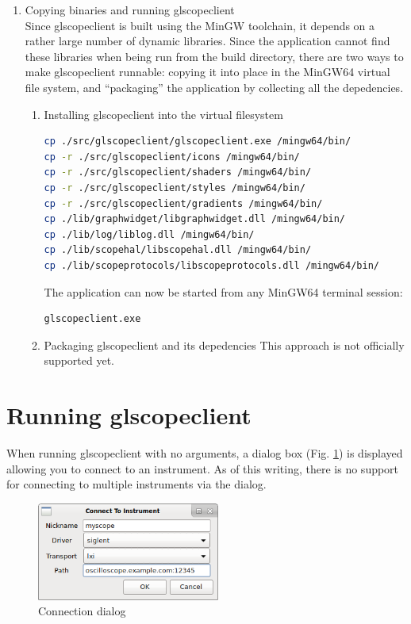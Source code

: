 \begin{enumerate}
\item Copying binaries and running glscopeclient \\
Since glscopeclient is built using the MinGW toolchain, it depends on a rather large number of dynamic libraries. Since the application cannot find these libraries when being run from the build directory, there are two ways to make glscopeclient runnable: copying it into place in the MinGW64 virtual file system, and ``packaging'' the application by collecting all the depedencies.

\begin{enumerate}
\item Installing glscopeclient into the virtual filesystem
\begin{lstlisting}[language=sh]
cp ./src/glscopeclient/glscopeclient.exe /mingw64/bin/
cp -r ./src/glscopeclient/icons /mingw64/bin/
cp -r ./src/glscopeclient/shaders /mingw64/bin/
cp -r ./src/glscopeclient/styles /mingw64/bin/
cp -r ./src/glscopeclient/gradients /mingw64/bin/
cp ./lib/graphwidget/libgraphwidget.dll /mingw64/bin/
cp ./lib/log/liblog.dll /mingw64/bin/
cp ./lib/scopehal/libscopehal.dll /mingw64/bin/
cp ./lib/scopeprotocols/libscopeprotocols.dll /mingw64/bin/
\end{lstlisting}
\vspace{0.5cm}
The application can now be started from any MinGW64 terminal session:
\vspace{0.5cm}
\begin{lstlisting}[language=sh]
glscopeclient.exe
\end{lstlisting}
\vspace{0.5cm}

\item Packaging glscopeclient and its depedencies
This approach is not officially supported yet.
\end{enumerate}

\end{enumerate}


\section{Running glscopeclient}

When running glscopeclient with no arguments, a dialog box (Fig. \ref{connection-dialog}) is displayed allowing you to
connect to an instrument. As of this writing, there is no support for connecting to multiple instruments via the
dialog.

\begin{figure}[h]
\centering
\includegraphics[width=6cm]{images/connection-dialog.png}
\caption{Connection dialog}
\label{connection-dialog}
\end{figure}

